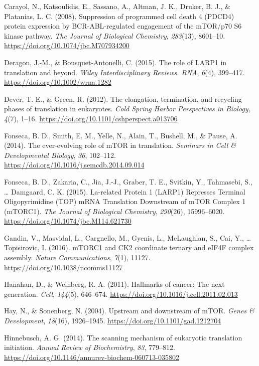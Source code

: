 \documentclass[12pt,openany]{book}
\begin{document}
\hypertarget{ref-Carayol2008}{}
Carayol, N., Katsoulidis, E., Sassano, A., Altman, J. K., Druker, B. J.,
\& Platanias, L. C. (2008). Suppression of programmed cell death 4
(PDCD4) protein expression by BCR-ABL-regulated engagement of the
mTOR/p70 S6 kinase pathway. \emph{The Journal of Biological Chemistry},
\emph{283}(13), 8601--10. \url{https://doi.org/10.1074/jbc.M707934200}

\hypertarget{ref-Deragon2015}{}
Deragon, J.-M., \& Bousquet-Antonelli, C. (2015). The role of LARP1 in
translation and beyond. \emph{Wiley Interdisciplinary Reviews. RNA},
\emph{6}(4), 399--417. \url{https://doi.org/10.1002/wrna.1282}

\hypertarget{ref-Dever2012}{}
Dever, T. E., \& Green, R. (2012). The elongation, termination, and
recycling phases of translation in eukaryotes. \emph{Cold Spring Harbor
Perspectives in Biology}, \emph{4}(7), 1--16.
\url{https://doi.org/10.1101/cshperspect.a013706}

\hypertarget{ref-Fonseca2014}{}
Fonseca, B. D., Smith, E. M., Yelle, N., Alain, T., Bushell, M., \&
Pause, A. (2014). The ever-evolving role of mTOR in translation.
\emph{Seminars in Cell \& Developmental Biology}, \emph{36}, 102--112.
\url{https://doi.org/10.1016/j.semcdb.2014.09.014}

\hypertarget{ref-Fonseca2015}{}
Fonseca, B. D., Zakaria, C., Jia, J.-J., Graber, T. E., Svitkin, Y.,
Tahmasebi, S., \ldots{} Damgaard, C. K. (2015). La-related Protein 1
(LARP1) Represses Terminal Oligopyrimidine (TOP) mRNA Translation
Downstream of mTOR Complex 1 (mTORC1). \emph{The Journal of Biological
Chemistry}, \emph{290}(26), 15996--6020.
\url{https://doi.org/10.1074/jbc.M114.621730}

\hypertarget{ref-Gandin2016a}{}
Gandin, V., Masvidal, L., Cargnello, M., Gyenis, L., McLaughlan, S.,
Cai, Y., \ldots{} Topisirovic, I. (2016). mTORC1 and CK2 coordinate
ternary and eIF4F complex assembly. \emph{Nature Communications},
\emph{7}(1), 11127. \url{https://doi.org/10.1038/ncomms11127}

\hypertarget{ref-Hanahan2011}{}
Hanahan, D., \& Weinberg, R. A. (2011). Hallmarks of cancer: The next
generation. \emph{Cell}, \emph{144}(5), 646--674.
\url{https://doi.org/10.1016/j.cell.2011.02.013}

\hypertarget{ref-Hay2004}{}
Hay, N., \& Sonenberg, N. (2004). Upstream and downstream of mTOR.
\emph{Genes \& Development}, \emph{18}(16), 1926--1945.
\url{https://doi.org/10.1101/gad.1212704}

\hypertarget{ref-Hinnebusch2014}{}
Hinnebusch, A. G. (2014). The scanning mechanism of eukaryotic
translation initiation. \emph{Annual Review of Biochemistry}, \emph{83},
779--812. \url{https://doi.org/10.1146/annurev-biochem-060713-035802}
\end{document}
